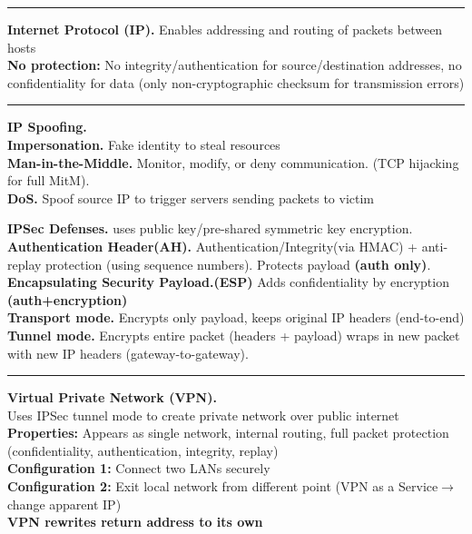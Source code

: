 \documentclass[9pt, a4paper]{extarticle}
\makeatletter
\renewcommand{\hline}{\noalign{\vskip 2px}\hrule\@height\arrayrulewidth\@width\linewidth\noalign{\vskip 2px}}
\makeatother
\begin{document}
\begin{minipage}[t]{0.495\textwidth}
\begin{minipage}[t]{0.52\textwidth}
	\end{minipage}\hline
	\begin{minipage}[t]{0.48\textwidth}
		\textbf{Internet Protocol (IP).} Enables addressing and routing of packets between hosts\\
		\textbf{No protection:} No integrity/authentication for source/destination addresses, no confidentiality for data (only non-cryptographic checksum for transmission errors)
		\hline
		\textbf{IP Spoofing.} \\\textbf{Impersonation.} Fake identity to steal resources\\
		\textbf{Man-in-the-Middle.} Monitor, modify, or deny communication. (TCP hijacking for full MitM).\\
		\textbf{DoS.} Spoof source IP to trigger servers sending packets to victim
	\end{minipage}\hfill\vline\hfill
	\begin{minipage}[t]{0.5\textwidth}
		\textbf{IPSec Defenses.} uses public key/pre-shared symmetric key encryption. \\
		\textbf{Authentication Header(AH).} Authentication/Integrity(via HMAC) + anti-replay protection (using sequence numbers). Protects payload \textbf{(auth only)}.\\
		\textbf{Encapsulating Security Payload.(ESP)} Adds confidentiality by encryption \textbf{(auth+encryption)}\\
		\textbf{Transport mode.} Encrypts only payload, keeps original IP headers (end-to-end)\\
		\textbf{Tunnel mode.} Encrypts entire packet (headers + payload) wraps in new packet with new IP headers (gateway-to-gateway).
	\end{minipage}\hline
	\begin{minipage}[t]{0.495\textwidth}
		\textbf{Virtual Private Network (VPN).}\\
		Uses IPSec tunnel mode to create private network over public internet\\
		\textbf{Properties:} Appears as single network, internal routing, full packet protection (confidentiality, authentication, integrity, replay)\\
		\textbf{Configuration 1:} Connect two LANs securely\\
		\textbf{Configuration 2:} Exit local network from different point (VPN as a Service$\rightarrow$change apparent IP)\\
		\textbf{VPN rewrites return address to its own}
	\end{minipage}\hfill\vline\hfill

\end{minipage}
\end{document}

